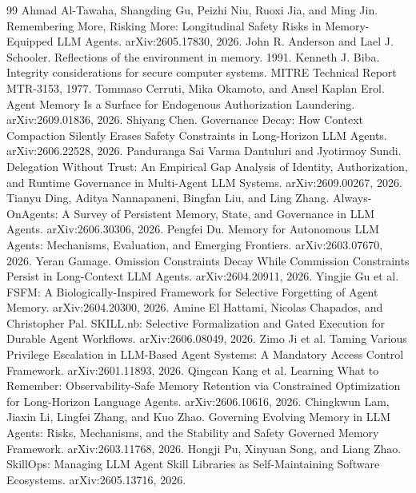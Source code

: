 \documentclass[11pt]{article}
\begin{document}

\begin{thebibliography}{99}
 Ahmad Al-Tawaha, Shangding Gu, Peizhi Niu, Ruoxi Jia, and Ming Jin. Remembering More, Risking More: Longitudinal Safety Risks in Memory-Equipped LLM Agents. arXiv:2605.17830, 2026.
 John R. Anderson and Lael J. Schooler. Reflections of the environment in memory. 1991.
 Kenneth J. Biba. Integrity considerations for secure computer systems. MITRE Technical Report MTR-3153, 1977.
 Tommaso Cerruti, Mika Okamoto, and Ansel Kaplan Erol. Agent Memory Is a Surface for Endogenous Authorization Laundering. arXiv:2609.01836, 2026.
 Shiyang Chen. Governance Decay: How Context Compaction Silently Erases Safety Constraints in Long-Horizon LLM Agents. arXiv:2606.22528, 2026.
 Panduranga Sai Varma Dantuluri and Jyotirmoy Sundi. Delegation Without Trust: An Empirical Gap Analysis of Identity, Authorization, and Runtime Governance in Multi-Agent LLM Systems. arXiv:2609.00267, 2026.
 Tianyu Ding, Aditya Nannapaneni, Bingfan Liu, and Ling Zhang. Always-OnAgents: A Survey of Persistent Memory, State, and Governance in LLM Agents. arXiv:2606.30306, 2026.
 Pengfei Du. Memory for Autonomous LLM Agents: Mechanisms, Evaluation, and Emerging Frontiers. arXiv:2603.07670, 2026.
 Yeran Gamage. Omission Constraints Decay While Commission Constraints Persist in Long-Context LLM Agents. arXiv:2604.20911, 2026.
 Yingjie Gu et al. FSFM: A Biologically-Inspired Framework for Selective Forgetting of Agent Memory. arXiv:2604.20300, 2026.
 Amine El Hattami, Nicolas Chapados, and Christopher Pal. SKILL.nb: Selective Formalization and Gated Execution for Durable Agent Workflows. arXiv:2606.08049, 2026.
 Zimo Ji et al. Taming Various Privilege Escalation in LLM-Based Agent Systems: A Mandatory Access Control Framework. arXiv:2601.11893, 2026.
 Qingcan Kang et al. Learning What to Remember: Observability-Safe Memory Retention via Constrained Optimization for Long-Horizon Language Agents. arXiv:2606.10616, 2026.
 Chingkwun Lam, Jiaxin Li, Lingfei Zhang, and Kuo Zhao. Governing Evolving Memory in LLM Agents: Risks, Mechanisms, and the Stability and Safety Governed Memory Framework. arXiv:2603.11768, 2026.
 Hongji Pu, Xinyuan Song, and Liang Zhao. SkillOps: Managing LLM Agent Skill Libraries as Self-Maintaining Software Ecosystems. arXiv:2605.13716, 2026.

\end{thebibliography}
\end{document}
